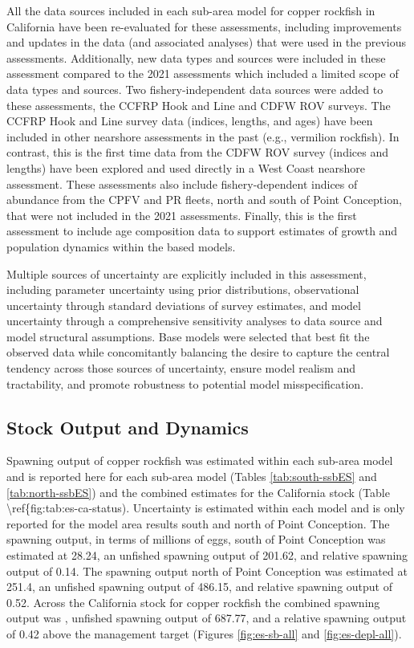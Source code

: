 \documentclass[11pt,
  english,
  letterpaper,
]{article}
\begin{document}
All the data sources included in each sub-area model for copper rockfish in California have been re-evaluated for these assessments, including improvements and updates in the data (and associated analyses) that were used in the previous assessments. Additionally, new data types and sources were included in these assessment compared to the 2021 assessments which included a limited scope of data types and sources. Two fishery-independent data sources were added to these assessments, the CCFRP Hook and Line and CDFW ROV surveys. The CCFRP Hook and Line survey data (indices, lengths, and ages) have been included in other nearshore assessments in the past (e.g., vermilion rockfish). In contrast, this is the first time data from the CDFW ROV survey (indices and lengths) have been explored and used directly in a West Coast nearshore assessment. These assessments also include fishery-dependent indices of abundance from the CPFV and PR fleets, north and south of Point Conception, that were not included in the 2021 assessments. Finally, this is the first assessment to include age composition data to support estimates of growth and population dynamics within the based models.

Multiple sources of uncertainty are explicitly included in this assessment, including parameter uncertainty using prior distributions, observational uncertainty through standard deviations of survey estimates, and model uncertainty through a comprehensive sensitivity analyses to data source and model structural assumptions. Base models were selected that best fit the observed data while concomitantly balancing the desire to capture the central tendency across those sources of uncertainty, ensure model realism and tractability, and promote robustness to potential model misspecification.

\hypertarget{stock-output-and-dynamics}{%
\subsection*{Stock Output and Dynamics}\label{stock-output-and-dynamics}}

Spawning output of copper rockfish was estimated within each sub-area model and is reported here for each sub-area model (Tables \ref{tab:south-ssbES} and \ref{tab:north-ssbES}) and the combined estimates for the California stock (Table \textbackslash ref\{fig:tab:es-ca-status). Uncertainty is estimated within each model and is only reported for the model area results south and north of Point Conception. The spawning output, in terms of millions of eggs, south of Point Conception was estimated at 28.24, an unfished spawning output of 201.62, and relative spawning output of 0.14. The spawning output north of Point Conception was estimated at 251.4, an unfished spawning output of 486.15, and relative spawning output of 0.52. Across the California stock for copper rockfish the combined spawning output was , unfished spawning output of 687.77, and a relative spawning output of 0.42 above the management target (Figures \ref{fig:es-sb-all} and \ref{fig:es-depl-all}).
\end{document}
